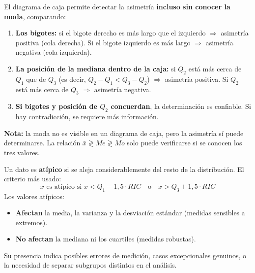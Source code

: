 \documentclass[11pt, letterpaper]{article}
\begin{document}
\begin{tcolorbox}[importantbox, title={¿Cómo detectar la asimetría desde un diagrama de caja?}]
El diagrama de caja permite detectar la asimetría \textbf{incluso sin conocer la moda}, comparando:
\begin{enumerate}[label=\arabic*.]
  \item \textbf{Los bigotes:} si el bigote derecho es más largo que el izquierdo $\Rightarrow$ asimetría positiva (cola derecha). Si el bigote izquierdo es más largo $\Rightarrow$ asimetría negativa (cola izquierda).
  \item \textbf{La posición de la mediana dentro de la caja:} si $Q_2$ está más cerca de $Q_1$ que de $Q_3$ (es decir, $Q_2 - Q_1 < Q_3 - Q_2$) $\Rightarrow$ asimetría positiva. Si $Q_2$ está más cerca de $Q_3$ $\Rightarrow$ asimetría negativa.
  \item \textbf{Si bigotes y posición de $Q_2$ concuerdan}, la determinación es confiable. Si hay contradicción, se requiere más información.
\end{enumerate}

\medskip

\textbf{Nota:} la moda no es visible en un diagrama de caja, pero la asimetría sí puede determinarse. La relación $\bar{x} \gtrless Me \gtrless Mo$ solo puede verificarse si se conocen los tres valores.
\end{tcolorbox}

\begin{tcolorbox}[importantbox, title={Valores atípicos (outliers)}]
Un dato es \textbf{atípico} si se aleja considerablemente del resto de la distribución. El criterio más usado:
\[
x \text{ es atípico si } x < Q_1 - 1{,}5 \cdot RIC \quad \text{o} \quad x > Q_3 + 1{,}5 \cdot RIC
\]
Los valores atípicos:
\begin{itemize}
  \item \textbf{Afectan} la media, la varianza y la desviación estándar (medidas sensibles a extremos).
  \item \textbf{No afectan} la mediana ni los cuartiles (medidas robustas).
\end{itemize}
Su presencia indica posibles errores de medición, casos excepcionales genuinos, o la necesidad de separar subgrupos distintos en el análisis.
\end{tcolorbox}
\end{document}
